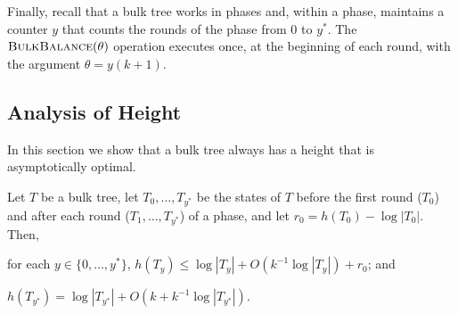 \documentclass[kpfonts]{patmorin}
\let\le\leqslant
\begin{document}
Finally, recall that a bulk tree works in phases and, within a phase, maintains a counter $y$ that counts the rounds of the phase from $0$ to $y^*$.  The $\textsc{BulkBalance}(\theta)$ operation executes once, at the beginning of each round, with the argument $\theta=y(k+1)$.

\subsection{Analysis of Height}

In this section we show that a bulk tree always has a height that is asymptotically optimal.

\begin{lem}
  Let $T$ be a bulk tree, let $T_0,\ldots,T_{y^*}$ be the states of $T$ before the first round ($T_0$) and after each round ($T_1,\ldots,T_{y^*}$) of a phase, and let $r_0=h(T_0)-\log|T_0|$.  Then,
  \begin{compactenum}[(i)]
    \item for each $y\in\{0,\ldots,y^*\}$, $h(T_y)\le \log|T_y| + O(k^{-1}\log|T_y|) + r_0$; and
    \item $h(T_{y^*}) = \log|T_{y^*}|+O(k+k^{-1}\log|T_{y^*}|)$.
  \end{compactenum}
\end{lem}
\end{document}
